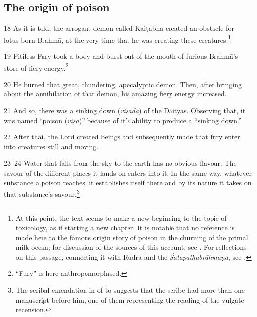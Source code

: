 \subsection{The origin of  poison}  \begin{translation}[resume]  

\item
 [18]  As it is told, the arrogant  demon called Kaiṭabha  created an obstacle for 
 lotus-born Brahmā, at  the very time that he  was creating these  
 creatures.\footnote{At  this point, the text  seems to make a new  beginning to 
 the topic  of toxicology, as if  starting a new  chapter.  It is notable  that no 
 reference is  made here to  the famous origin  story of poison in the  churning 
 of the primal  milk ocean; for  discussion of the  sources of this  account, see  
 \cite{bede-1967}. For reflections on this  passage, connecting it  with Rudra 
 and the  \emph{Śatapathabrāhmaṇa},  see  \cite{mana-2019}.}  

\item
[19] Pitiless Fury took a  body and burst out of  the mouth of furious  Brahmā's 
store of fiery  energy.\footnote{“Fury”  is here  anthropomorphised.}  

\item
[20]  He burned that  great, thundering,  apocalyptic  demon. Then,  after 
bringing about the annihilation of  that demon, his  amazing fiery  energy 
increased.  

\item
 [21]  And so, there was a  sinking down  (\emph{viṣāda}) of  the Daityas.  
 Observing that, it was named  “poison  (\emph{viṣa})”  because of it's  ability 
 to produce a  “sinking down.”  

\item
 [22] After  that, the Lord  created beings and  subsequently made  that fury 
 enter into creatures  still and moving.  

\item
 [23--24]  Water that falls  from the sky to the  earth has no  obvious flavour. 
 The savour of the  different places it  lands on enters into  it.  In the same way, 
 whatever substance  a poison reaches, it  establishes itself  there and by its  
 nature it  takes on that  substance's  savour.\footnote{The  scribal emendation  
 in   of    to    
 suggests that the  scribe had more  than  one manuscript  before him, one  of 
 them  representing the  reading of the  vulgate  recension.}  


\end{translation}
